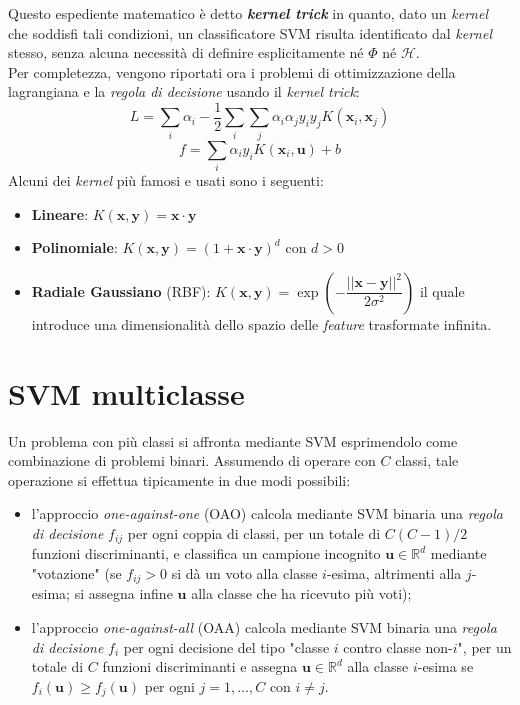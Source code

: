 Questo espediente matematico è detto \textbf{\emph{kernel trick}} in quanto, dato un \emph{kernel} che soddisfi tali condizioni, un classificatore SVM risulta identificato dal \emph{kernel} stesso, senza alcuna necessità di definire esplicitamente né $\Phi$ né $\mathcal{H}$.
\\
Per completezza, vengono riportati ora i problemi di ottimizzazione della lagrangiana e la \emph{regola di decisione} usando il \emph{kernel trick}:
\begin{equation}
\label{eq:lagrangiana_con_kernel}
L=\sum_i\alpha_i-\dfrac{1}{2}\sum_i\sum_j\alpha_i\alpha_jy_iy_jK(\mathbf{x}_i,\mathbf{x}_j)
\end{equation}
\begin{equation}
\label{eq:regola_di_decisione_con_kernel}
f=\sum_i\alpha_iy_iK(\mathbf{x}_i,\mathbf{u})+b
\end{equation}
Alcuni dei \emph{kernel} più famosi e usati sono i seguenti:
\begin{itemize}
\item \textbf{Lineare}: $K(\mathbf{x},\mathbf{y})=\mathbf{x}\cdot\mathbf{y}$
\item \textbf{Polinomiale}: $K(\mathbf{x},\mathbf{y})=\left (1+\mathbf{x}\cdot\mathbf{y}\right )^d$ con $d>0$
\item \textbf{Radiale Gaussiano} (RBF):  $K(\mathbf{x},\mathbf{y})=\exp\left (-\dfrac{\vert\vert\mathbf{x}-\mathbf{y}\vert\vert^2}{2\sigma^2}\right )$ il quale introduce una dimensionalità dello spazio delle \emph{feature} trasformate infinita.
\end{itemize}
\section{SVM multiclasse}
Un problema con più classi si affronta mediante SVM esprimendolo come combinazione di problemi binari. Assumendo di operare con $C$ classi, tale operazione si effettua tipicamente in due modi possibili:
\begin{itemize}
\item l'approccio \emph{one-against-one} (OAO) calcola mediante SVM binaria una \emph{regola di decisione} $f_{ij}$ per ogni coppia di classi, per un totale di $C(C-1)/2$ funzioni discriminanti, e classifica un campione incognito $\mathbf{u}\in\mathbb{R}^d$ mediante "votazione" (se $f_{ij}>0$ si dà un voto alla classe $i$-esima, altrimenti alla $j$-esima; si assegna infine $\mathbf{u}$ alla classe che ha ricevuto più voti);
\item l'approccio \emph{one-against-all} (OAA) calcola mediante SVM binaria una \emph{regola di decisione} $f_{i}$ per ogni decisione del tipo "classe $i$ contro classe non-$i$", per un totale di $C$ funzioni discriminanti e assegna $\mathbf{u}\in\mathbb{R}^d$ alla classe $i$-esima se $f_i(\mathbf{u})\geq f_j(\mathbf{u})$ per ogni $j=1,\ldots,C$ con $i\neq j$.
\end{itemize}


